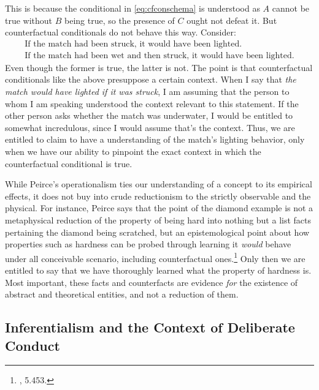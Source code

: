 This is because the conditional in \ref{eq:cfconschema} is understood as \(A\) cannot be
true without \(B\) being true, so the presence of \(C\) ought not defeat
it. But counterfactual conditionals do not behave this way. Consider:
\begin{gather}
	\text{If the match had been struck, it would have been lighted.}\label{eq:cfconextrue}\\
	\text{If the match had been wet and then struck, it would have been lighted.}\label{eq:cfconexfalse}
\end{gather}
%
Even though the former is true, the latter is not. The point is that
counterfactual conditionals like the above presuppose a certain context.
When I say that \emph{the match would have lighted if it was struck}, I am
assuming that the person to whom I am speaking understood the context
relevant to this statement. If the other person asks whether the match was underwater, I would be entitled to somewhat incredulous, since I would assume that's the context. Thus, we are entitled to claim to have a understanding of the match's lighting behavior, only when we have our ability to pinpoint the exact context in which the counterfactual conditional is true.

While Peirce's operationalism ties our understanding of a concept
to its empirical effects, it does not buy into crude reductionism to the
strictly observable and the physical. For instance, Peirce says that the
point of the diamond example is not a metaphysical reduction of the
property of being hard into nothing but a list facts pertaining the
diamond being scratched, but an epistemological point about how
properties such as hardness can be probed through learning it
\emph{would} behave under all conceivable scenario, including
counterfactual ones.\footnote{\cite{CP}, 5.453.} Only then we are entitled to say that we have
thoroughly learned what the property of hardness is. Most important,
these facts and counterfacts are evidence \emph{for} the existence of
abstract and theoretical entities, and not a reduction of them.

\hypertarget{inferentialism-and-the-context-of-deliberate-conduct}{%
\subsection{Inferentialism and the Context of Deliberate
Conduct}\label{inferentialism-and-the-context-of-deliberate-conduct}}

